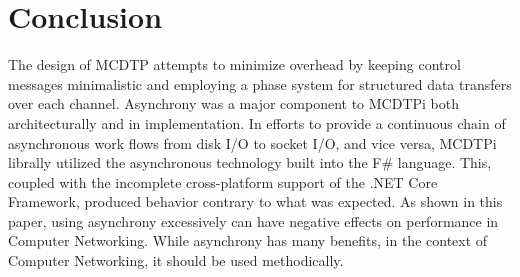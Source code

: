 \chapter{Conclusion}

The design of MCDTP attempts to minimize overhead by keeping control messages minimalistic and employing a phase system for structured data transfers over each channel. Asynchrony was a major component to MCDTPi both architecturally and in implementation. In efforts to provide a continuous chain of asynchronous work flows from disk I/O to socket I/O, and vice versa, MCDTPi librally utilized the asynchronous technology built into the F\# language. This, coupled with the incomplete cross-platform support of the .NET Core Framework, produced behavior contrary to what was expected. As shown in this paper, using asynchrony excessively can have negative effects on performance in Computer Networking. While asynchrony has many benefits, in the context of Computer Networking, it should be used methodically.